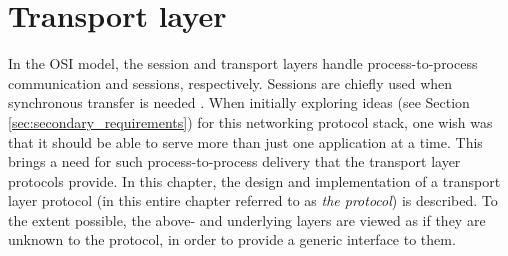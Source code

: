 \chapter{Transport layer}\label{chap:transport}
In the OSI model, the session and transport layers handle process-to-process communication and sessions, respectively. Sessions are chiefly used when synchronous transfer is needed \cite[39]{KOM}. When initially exploring ideas (see Section \ref{sec:secondary_requirements}) for this networking protocol stack, one wish was that it should be able to serve more than just one application at a time. This brings a need for such process-to-process delivery that the transport layer protocols provide. In this chapter, the design and implementation of a transport layer protocol (in this entire chapter referred to as \textit{the protocol}) is described. To the extent possible, the above- and underlying layers are viewed as if they are unknown to the protocol, in order to provide a generic interface to them.
